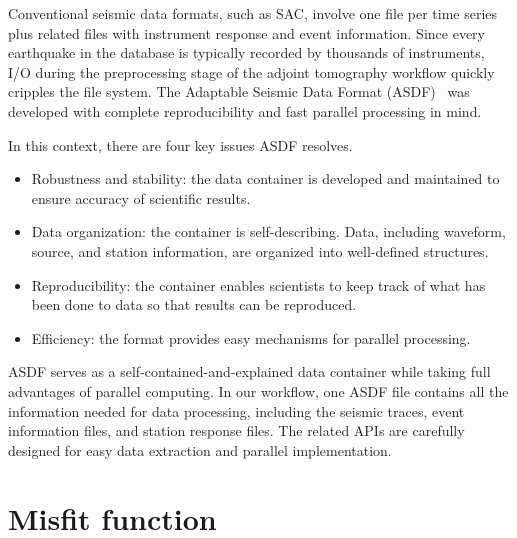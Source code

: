 \documentclass[extra,mreferee]{gji}
\begin{document}
Conventional seismic data formats, such as SAC, involve one file per time series plus related files with instrument response and event information.
Since every earthquake in the database is typically recorded by thousands of instruments, I/O during the preprocessing stage of the adjoint tomography workflow quickly cripples the file system.
The Adaptable Seismic Data Format (ASDF)~\citep[][ \texttt{https://seismic-data.org/ }]{krischer2016adaptable} was developed with complete reproducibility and fast parallel processing in mind.

In this context, there are four key issues ASDF resolves.
\begin{itemize}
    \item Robustness and stability: the data container is developed and maintained to ensure accuracy of scientific results.
    \item Data organization: the container is self-describing. Data, including waveform, source, and station information, are organized into well-defined structures.
    \item Reproducibility: the container enables scientists to keep track of what has been done to data so that results can be reproduced.
    \item Efficiency: the format provides easy mechanisms for parallel processing.
\end{itemize}
ASDF serves as a self-contained-and-explained data container while taking full advantages of parallel computing.
In our workflow,
one ASDF file contains all the information needed for data processing, including the seismic traces, event information files, and station response files.
The related APIs are carefully designed for easy data extraction and parallel implementation.

\section{Misfit function}
\label{section:misfit}
\end{document}
